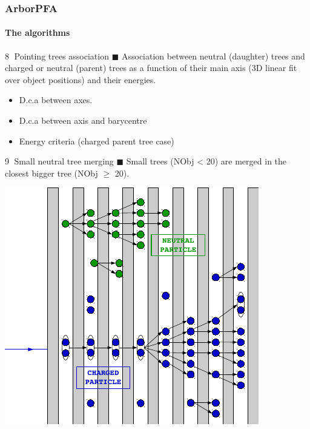 \documentclass[8pt]{beamer}
\begin{document}
  \begin{frame}
  \frametitle{ArborPFA}
  \framesubtitle{The algorithms}
    \begin{minipage}{0.55\linewidth}
      \begin{block}{\textcircled{{\footnotesize 8}} Pointing trees association}
        $\blacksquare$ Association between neutral (daughter) trees and charged or neutral (parent) trees as a function of their main axis (3D linear fit over object positions) and their energies.
        \begin{itemize}
          \item D.c.a between axes.
          \item D.c.a between axis and barycentre
          \item Energy criteria (charged parent tree case)
        \end{itemize}
      \end{block}
      \begin{block}{\textcircled{{\footnotesize 9}} Small neutral tree merging}
        $\blacksquare$ Small trees (NObj < 20) are merged in the closest bigger tree (NObj $\geq$ 20).
      \end{block}
    \end{minipage} \hfill
    \begin{minipage}{0.415\linewidth}
      \begin{center}
        \includegraphics[width=\linewidth]{PfoCreation.pdf}

\end{center}
\end{minipage}
\end{frame}
\end{document}
